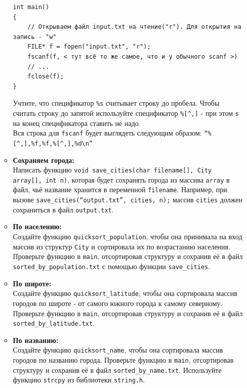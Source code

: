\documentclass{article}
\begin{document}
\begin{itemize}
\begin{itemize}
\begin{lstlisting}
int main()
{
    // Открываем файл input.txt на чтение("r"). Для открытия на запись - "w"
    FILE* f = fopen("input.txt", "r");
    fscanf(f, < тут всё то же самое, что и у обычного scanf >)
    // ...
    fclose(f);
}
\end{lstlisting}
Учтите, что спецификатор \texttt{\%s} считывает строку до пробела. Чтобы считать строку до запятой используйте спецификатор \texttt{\%[\textasciicircum,]} - при этом \texttt{s} на конец спецификатора ставить не надо.\\
Вся строка для \texttt{fscanf} будет выглядеть следующим образом:
\texttt{``\%[\textasciicircum,],\%f,\%f,\%[\textasciicircum,],\%d\textbackslash n''}

\item \textbf{Сохраняем города:}\\ Написать функцию \texttt{void save\_cities(char filename[], City array[], int n)}, которая будет сохранять города из массива \texttt{array} в файл, чьё название хранится в переменной \texttt{filename}. Например, при вызове \texttt{save\_cities(``output.txt'', cities, n);} массив \texttt{cities} должен сохраниться в файл \texttt{output.txt}.

\item \textbf{По населению:}\\ Создайте функцию \texttt{quicksort\_population}, чтобы она принимала на вход массив из структур \texttt{City} и сортировала их по возрастанию населения. Проверьте функцию в \texttt{main}, отсортировав структуру и сохранив её в файл \texttt{sorted\_by\_population.txt} с помощью функции \texttt{save\_cities}.

\item \textbf{По широте:}\\ Создайте функцию \texttt{quicksort\_latitude}, чтобы она сортировала массив городов по широте - от самого южного города к самому северному. Проверьте функцию в \texttt{main}, отсортировав структуру и сохранив её в файл \texttt{sorted\_by\_latitude.txt}.

\item \textbf{По названию:}\\ Создайте функцию \texttt{quicksort\_name}, чтобы она сортировала массив городов по названию города. Проверьте функцию в \texttt{main}, отсортировав структуру и сохранив её в файл \texttt{sorted\_by\_name.txt}. Используйте функцию \texttt{strcpy} из библиотеки \texttt{string.h}.
\end{itemize}
\end{itemize}
\end{document}
